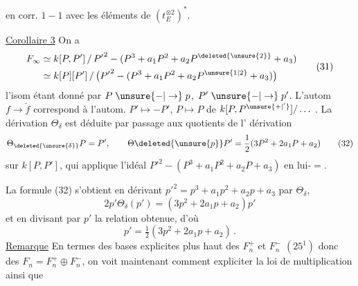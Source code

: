 en corr. $1-1$ avec les éléments de $(t_E^{\otimes2})^*$.

\uline{Corollaire 3} On a
\[
 \begin{aligned}
 F_\infty&\simeq k[P,P']\,/\,{P'}^2-(P^3+a_1P^2+a_2P^{\deleted{\unsure{2}}}+a_3)\\
 &\simeq k[P][P']\,/\,\bigl({P'}^2-(P^3+a_1P^2+a_2P^{\unsure{1|2}}+a_3)\bigr)
 \end{aligned} \tag*{(31)}
\]
l'isom étant donné par $P\mathrel{\unsure{-|\to}}p$, $P'\mathrel{\unsure{-|\to}}p'$. L'autom $f\to\check f$ correspond à l'autom. $P'\mapsto-P'$, $P\mapsto P$ de $k[P,P^{\unsure{+|'}}]/\ldots$ . La dérivation $\Theta_\delta$ est déduite par passage aux quotients de l' dérivation
\[
 \Theta_{\deleted{\unsure{\delta}}}P=P',\qquad
 \Theta\deleted{\unsure{p}}P'=\frac12(3P^2+2a_1P+a_2) \tag*{(32)}
\]
sur $k[P,P']$, qui applique l'idéal $ {P'}^2-(P^3+a_1P^2+a_2P+a_3)$ en lui-$=$.

La formule (32) s'obtient en dérivant $ {p'}^2=p^3+a_1p^2+a_2p+a_3$ par $\Theta_\delta$,  
\[
 2p'\Theta_\delta(p')=(3p^2+2a_1p+a_2)p'
\]
et en divisant par $p'$ la relation obtenue, d'où
\[
 p'=\tfrac12(3p^2+2a_1p+a_2)\,. \tag*{(33)}
\]
\uline{Remarque} En termes des bases explicites plus haut des $F_n^+$ et $F_n^-$ $(25^1)$ donc des $F_n=F_n^+\oplus F_n^-$, on voit maintenant comment expliciter la loi de multiplication  ainsi que
